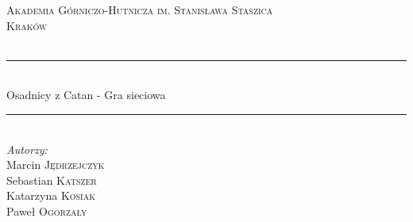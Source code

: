 \documentclass[a4paper, 11pt]{article}
\begin{document}
	
	\begin{titlepage}
		
		
		
		\newcommand{\HRule}{\rule{\linewidth}{0.5mm}} %
		
		\center %
		
		
		\textsc{\LARGE Akademia Górniczo-Hutnicza im. Stanisława Staszica}\\[1.5cm] %
		\textsc{\Large Kraków}\\[0.5cm] %
		\textsc{\large }\\[0.5cm] %
		
		
		\HRule \\[0.4cm]
		{\fontsize{38}{50}\selectfont Osadnicy z Catan - Gra sieciowa}
		\HRule \\[1.5cm]
		
		
		\Large \emph{Autorzy:}\\
		Marcin \textsc{Jędrzejczyk}\\ %
		Sebastian \textsc{Katszer}\\ %
		Katarzyna \textsc{Kosiak} \\
		Paweł \textsc{Ogorzały}\\[3cm]\ %
		

\end{titlepage}
\end{document}

